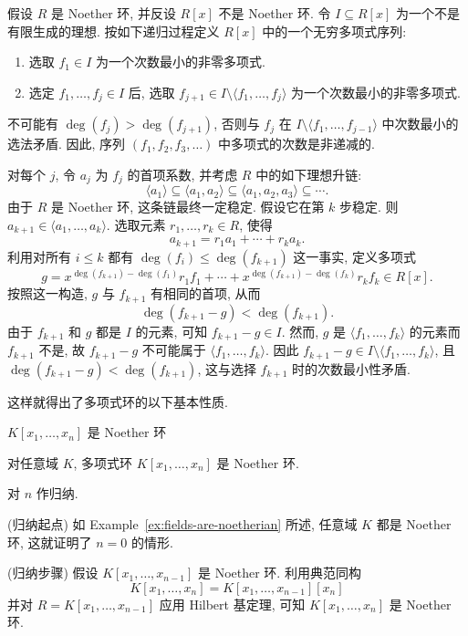 \begin{Proof}
  假设 $R$ 是 Noether 环, 并反设 $R[x]$ 不是 Noether 环. 令 $I\subseteq R[x]$ 为一个不是有限生成的理想. 按如下递归过程定义 $R[x]$ 中的一个无穷多项式序列:
  \begin{enumerate}[label=\arabic*.]
    \item 选取 $f_{1}\in I$ 为一个次数最小的非零多项式.
    \item 选定 $f_{1},\ldots,f_{j}\in I$ 后, 选取 $f_{j+1}\in I\setminus\langle f_{1},\ldots,f_{j}\rangle$ 为一个次数最小的非零多项式.
  \end{enumerate}
  不可能有 $\deg(f_{j})>\deg(f_{j+1})$, 否则与 $f_{j}$ 在 $I\setminus\langle f_{1},\ldots,f_{j-1}\rangle$ 中次数最小的选法矛盾. 因此, 序列 $(f_{1},f_{2},f_{3},\ldots)$ 中多项式的次数是非递减的.

  对每个 $j$, 令 $a_{j}$ 为 $f_{j}$ 的首项系数, 并考虑 $R$ 中的如下理想升链:
  \[
    \langle a_{1}\rangle\subseteq\langle a_{1},a_{2}\rangle
    \subseteq\langle a_{1},a_{2},a_{3}\rangle\subseteq\cdots.
  \]
  由于 $R$ 是 Noether 环, 这条链最终一定稳定. 假设它在第 $k$ 步稳定. 则 $a_{k+1}\in\langle a_{1},\ldots,a_{k}\rangle$. 选取元素 $r_{1},\ldots,r_{k}\in R$, 使得
  \[
    a_{k+1}=r_{1}a_{1}+\cdots+r_{k}a_{k}.
  \]
  利用对所有 $i\leq k$ 都有 $\deg(f_{i})\leq\deg(f_{k+1})$ 这一事实, 定义多项式
  \[
    g=x^{\deg(f_{k+1})-\deg(f_{1})}r_{1}f_{1}
      +\cdots+x^{\deg(f_{k+1})-\deg(f_{k})}r_{k}f_{k}\in R[x].
  \]
  按照这一构造, $g$ 与 $f_{k+1}$ 有相同的首项, 从而
  \[
    \deg(f_{k+1}-g)<\deg(f_{k+1}).
  \]
  由于 $f_{k+1}$ 和 $g$ 都是 $I$ 的元素, 可知 $f_{k+1}-g\in I$. 然而, $g$ 是 $\langle f_{1},\ldots,f_{k}\rangle$ 的元素而 $f_{k+1}$ 不是, 故 $f_{k+1}-g$ 不可能属于 $\langle f_{1},\ldots,f_{k}\rangle$. 因此 $f_{k+1}-g\in I\setminus\langle f_{1},\ldots,f_{k}\rangle$, 且 $\deg(f_{k+1}-g)<\deg(f_{k+1})$, 这与选择 $f_{k+1}$ 时的次数最小性矛盾.
\end{Proof}

这样就得出了多项式环的以下基本性质.

\begin{Corollary}{{\textmd{$K[x_{1},\ldots,x_{n}]$} 是 Noether 环}}\leavevmode\label{cor:polynomial-rings-are-noetherian}
  \strut\par\nopagebreak[4]\noindent
  对任意域 $K$, 多项式环 $K[x_{1},\ldots,x_{n}]$ 是 Noether 环.
\end{Corollary}

\begin{Proof}
  对 $n$ 作归纳.

  (归纳起点) 如 Example~\ref{ex:fields-are-noetherian} 所述, 任意域 $K$ 都是 Noether 环, 这就证明了 $n=0$ 的情形.

  (归纳步骤) 假设 $K[x_{1},\ldots,x_{n-1}]$ 是 Noether 环. 利用典范同构
  \[
    K[x_{1},\ldots,x_{n}]=K[x_{1},\ldots,x_{n-1}][x_{n}]
  \]
  并对 $R=K[x_{1},\ldots,x_{n-1}]$ 应用 Hilbert 基定理, 可知 $K[x_{1},\ldots,x_{n}]$ 是 Noether 环.
\end{Proof}


